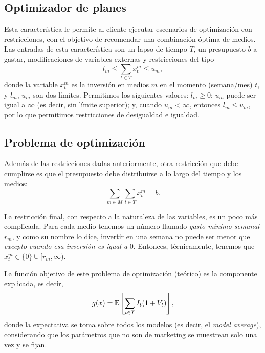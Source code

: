 \subsection{Optimizador de planes}

Esta característica le permite al cliente ejecutar escenarios de optimización con restricciones, con el objetivo de recomendar una combinación óptima de medios. Las entradas de esta característica son un lapso de tiempo \(T\), un presupuesto \(b\) a gastar, modificaciones de variables externas y restricciones del tipo
\[ l_m \leq \sum_{t \in T} x_t^m \leq u_m, \]
donde la variable \(x_t^m\) es la inversión en medios \(m\) en el momento (semana/mes) \(t\), y \(l_m\), \(u_m\) son dos límites. Permitimos los siguientes valores: \(l_m \geq 0\); \(u_m\) puede ser igual a \(\infty\) (es decir, sin límite superior); y, cuando \(u_m < \infty\), entonces \(l_m \leq u_m\), por lo que permitimos restricciones de desigualdad e igualdad.

\subsection{Problema de optimización}

Además de las restricciones dadas anteriormente, otra restricción que debe cumplirse es que el presupuesto debe distribuirse a lo largo del tiempo y los medios:
\[ \sum_{m \in M} \sum_{t \in T} x_t^m = b. \]

La restricción final, con respecto a la naturaleza de las variables, es un poco más complicada. Para cada medio tenemos un número llamado \emph{gasto mínimo semanal} \(r_m\), y como su nombre lo dice, invertir en una semana no puede ser menor que \emph{excepto cuando esa inversión es igual a} \(0 \). Entonces, técnicamente, tenemos que \(x_t^m \in \{0\} \cup [r_m, \infty)\).

La función objetivo de este problema de optimización (teórico) es la componente explicada, es decir,
\begin{equation}
\label{eq:strategy}
g(x) = \mathbb{E} \left[\sum_{t \in T} I_t (1 + V_t)\right],
\end{equation}
donde la expectativa se toma sobre todos los modelos (es decir, el \emph{model average}), considerando que los parámetros que no son de marketing se muestrean solo una vez y se fijan. 